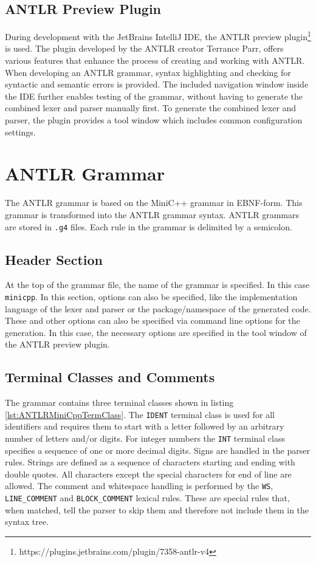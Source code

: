 \subsection{ANTLR Preview Plugin}

During development with the JetBrains IntelliJ IDE, the ANTLR preview plugin\footnote{https://plugins.jetbrains.com/plugin/7358-antlr-v4} is used. The plugin developed by the ANTLR creator Terrance Parr, offers various features that enhance the process of creating and working with ANTLR. When developing an ANTLR grammar, syntax highlighting and checking for syntactic and semantic errors is provided. The included navigation window inside the IDE further enables testing of the grammar, without having to generate the combined lexer and parser manually first. To generate the combined lexer and parser, the plugin provides a tool window which includes common configuration settings.

\section{ANTLR Grammar}
\label{cha:ANTLRGrammar}

The ANTLR grammar is based on the MiniC++ grammar in EBNF-form. This grammar is transformed into the ANTLR grammar syntax. ANTLR grammars are stored in \texttt{.g4} files. Each rule in the grammar is delimited by a semicolon. 

\subsection{Header Section}

At the top of the grammar file, the name of the grammar is specified. In this case \texttt{minicpp}. In this section, options can also be specified, like the implementation language of the lexer and parser or the package/namespace of the generated code. These and other options can also be specified via command line options for the generation. In this case, the necessary options are specified in the tool window of the ANTLR preview plugin. 


\subsection{Terminal Classes and Comments}

The grammar contains three terminal classes shown in listing \ref{lst:ANTLRMiniCppTermClass}. The \texttt{IDENT} terminal class is used for all identifiers and requires them to start with a letter followed by an arbitrary number of letters and/or digits. For integer numbers the \texttt{INT} terminal class specifies a sequence of one or more decimal digits. Signs are handled in the parser rules. Strings are defined as a sequence of characters starting and ending with double quotes. All characters except the special characters for end of line are allowed. The comment and whitespace handling is performed by the \texttt{WS}, \verb|LINE_COMMENT| and \verb|BLOCK_COMMENT| lexical rules. These are special rules that, when matched, tell the parser to skip them and therefore not include them in the syntax tree. 

